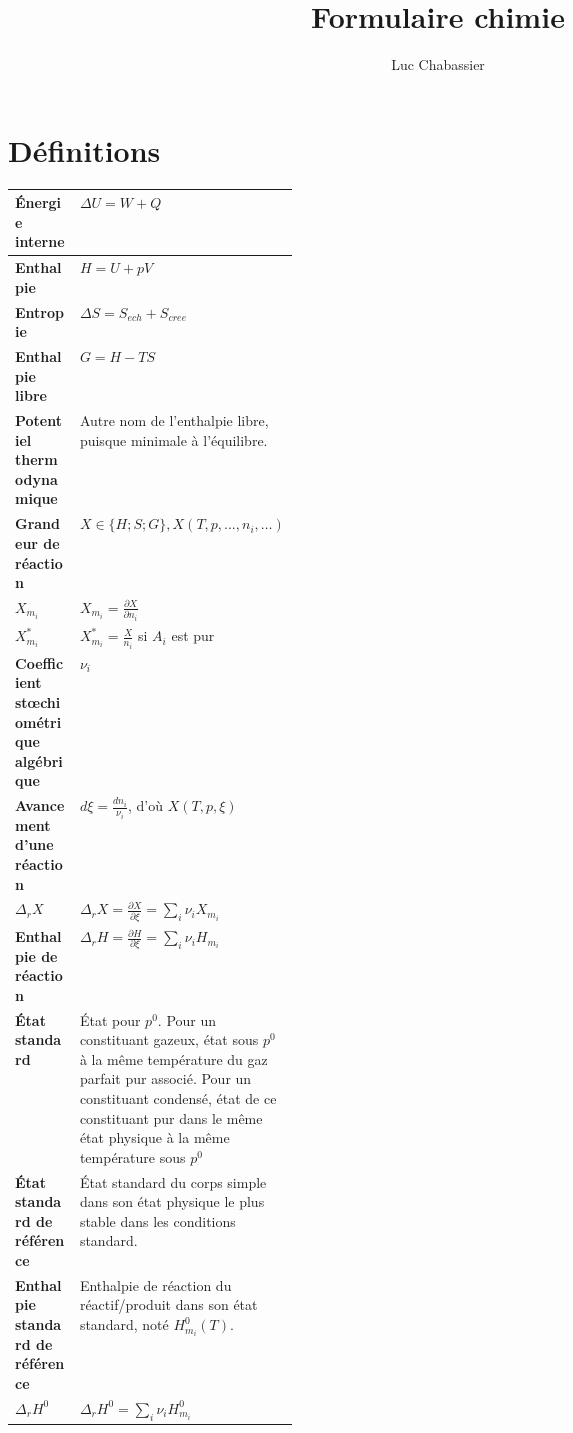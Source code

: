 \documentclass[12pt,a4paper] {article}
\begin{document}
\title{Formulaire chimie}
\author{Luc Chabassier}
\maketitle

\section{Définitions}
\begin{tabularx}{\linewidth}{|>{\bfseries}p{0.33\linewidth}|X|} \hline
    Énergie interne & $\Delta U = W + Q$ \\ \hline
    Enthalpie        & $H = U + pV$ \\ \hline
    Entropie        & $\Delta S = S_{ech} + S_{cree}$ \\ \hline
    Enthalpie libre  & $G = H - TS$ \\ \hline
    Potentiel thermodynamique & Autre nom de l'enthalpie libre, puisque minimale à l'équilibre. \\ \hline
    Grandeur de réaction & $X \in\{H; S; G\}, X(T, p, \ldots, n_i, \ldots)$ \\ \hline
    $X_{m_i}$ & $X_{m_i} = \frac{\partial X}{\partial n_i}$ \\ \hline
    $X_{m_i}^*$ & $X_{m_i}^* = \frac{X}{n_i}$ si $A_i$ est pur \\ \hline
    Coefficient stœchiométrique algébrique & $\nu_i$ \\ \hline
    Avancement d'une réaction & $d\xi = \frac{dn_i}{\nu_i}$, d'où $X(T,p,\xi)$ \\ \hline
    $\Delta_r X$ & $\Delta_r X = \frac{\partial X}{\partial \xi} = \sum_i \nu_i X_{m_i}$ \\ \hline
    Enthalpie de réaction & $\Delta_r H = \frac{\partial H}{\partial \xi} = \sum_i \nu_i H_{m_i}$ \\ \hline
    État standard & État pour $p^0$. Pour un constituant gazeux, état sous $p^0$ à la même température du gaz parfait pur associé. Pour un constituant condensé, état de ce constituant pur dans le même état physique à la même température sous $p^0$ \\ \hline
    État standard de référence & État standard du corps simple dans son état physique le plus stable dans les conditions standard. \\ \hline
    Enthalpie standard de référence & Enthalpie de réaction du réactif/produit dans son état standard, noté $H_{m_i}^0(T)$. \\ \hline
    $\Delta_r H^0$ & $\Delta_r H^0 = \sum_i \nu_i H_{m_i}^0$ \\ \hline

\end{tabularx}
\end{document}
